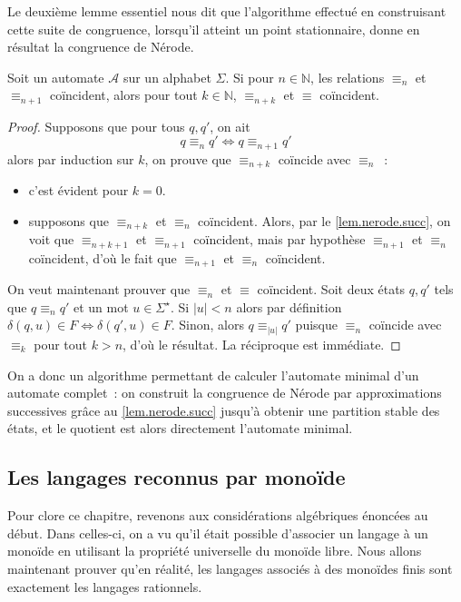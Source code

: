 Le deuxième lemme essentiel nous dit que l'algorithme effectué en construisant
cette suite de congruence, lorsqu'il atteint un point stationnaire, donne en
résultat la congruence de Nérode.

\begin{lemma}
  Soit un automate $\mathcal A$ sur un alphabet $\Sigma$. Si pour
  $n \in \mathbb N$, les relations $\equiv_n$ et $\equiv_{n+1}$ coïncident,
  alors pour tout $k \in \mathbb N$, $\equiv_{n+k}$ et $\equiv$ coïncident.
\end{lemma}

\begin{proof}
  Supposons que pour tous $q,q'$, on ait
  \[q\equiv_n q' \iff q\equiv_{n+1} q'\]
  alors par induction sur $k$, on prouve que $\equiv_{n+k}$ coïncide avec
  $\equiv_n$~:
  \begin{itemize}
  \item c'est évident pour $k = 0$.
  \item supposons que $\equiv_{n+k}$ et $\equiv_n$ coïncident. Alors, par le
    \cref{lem.nerode.succ}, on voit que $\equiv_{n+k+1}$ et $\equiv_{n+1}$
    coïncident, mais par hypothèse $\equiv_{n+1}$ et $\equiv_n$ coïncident,
    d'où le fait que $\equiv_{n+1}$ et $\equiv_n$ coïncident.
  \end{itemize}

  On veut maintenant prouver que $\equiv_n$ et $\equiv$ coïncident. Soit deux
  états $q,q'$ tels que $q\equiv_n q'$ et un mot $u \in \Sigma^\star$. Si
  $|u| < n$ alors par définition $\delta(q,u) \in F \iff \delta(q',u) \in F$.
  Sinon, alors $q\equiv_{|u|} q'$ puisque $\equiv_n$ coïncide avec $\equiv_k$
  pour tout $k > n$, d'où le résultat. La réciproque est immédiate.
\end{proof}

On a donc un algorithme permettant de calculer l'automate minimal d'un automate
complet~: on construit la congruence de Nérode par approximations successives
grâce au \cref{lem.nerode.succ} jusqu'à obtenir une partition stable des états,
et le quotient est alors directement l'automate minimal.

\subsection{Les langages reconnus par monoïde}

Pour clore ce chapitre, revenons aux considérations algébriques énoncées au
début. Dans celles-ci, on a vu qu'il était possible d'associer un langage à un
monoïde en utilisant la propriété universelle du monoïde libre. Nous allons
maintenant prouver qu'en réalité, les langages associés à des monoïdes finis
sont exactement les langages rationnels.

